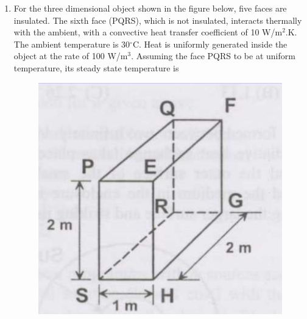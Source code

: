 \documentclass[journal,12pt,onecolumn]{IEEEtran}
\begin{document}
\begin{enumerate}
          \begin{enumerate}
          \end{enumerate}

    \item For the three dimensional object shown in the figure below, five faces are insulated. The sixth face (PQRS), which is not insulated, interacts thermally with the ambient, with a convective heat transfer coefficient of 10 W/m$^2$.K. The ambient temperature is 30$^\circ$C. Heat is uniformly generated inside the object at the rate of 100 W/m$^3$. Assuming the face PQRS to be at uniform temperature, its steady state temperature is

          \begin{figure}[H]
              \centering
              \includegraphics[scale=0.3]{q50}
              \caption{}
              \label{q50}
          \end{figure}


\end{enumerate}
\end{document}
